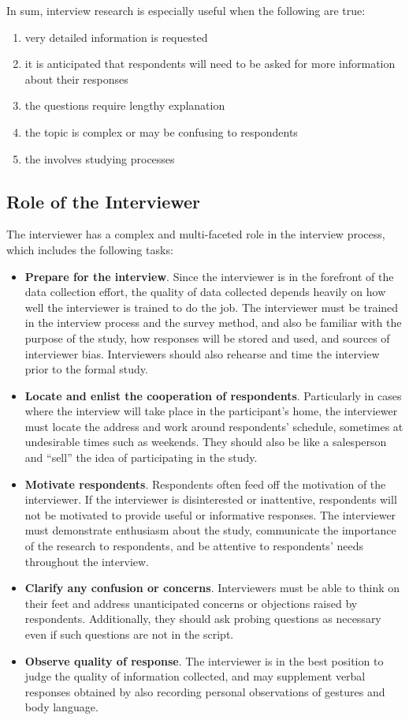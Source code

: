 In sum, interview research is especially useful when the following are true:

\begin{enumerate}
	\item very detailed information is requested
	\item it is anticipated that respondents will need to be asked for more information about their responses
	\item the questions require lengthy explanation
	\item the topic is complex or may be confusing to respondents
	\item the involves studying processes
\end{enumerate}

\subsection{Role of the Interviewer}

The interviewer has a complex and multi-faceted role in the interview process, which includes the following tasks:

\begin{itemize}
	\item \textbf{Prepare for the interview}. Since the interviewer is in the forefront of the data collection effort, the quality of data collected depends heavily on how well the interviewer is trained to do the job. The interviewer must be trained in the interview process and the survey method, and also be familiar with the purpose of the study, how responses will be stored and used, and sources of interviewer bias. Interviewers should also rehearse and time the interview prior to the formal study.
	\item \textbf{Locate and enlist the cooperation of respondents}. Particularly in cases where the interview will take place in the participant's home, the interviewer must locate the address and work around respondents' schedule, sometimes at undesirable times such as weekends. They should also be like a salesperson and ``sell'' the idea of participating in the study.
	\item \textbf{Motivate respondents}. Respondents often feed off the motivation of the interviewer. If the interviewer is disinterested or inattentive, respondents will not be motivated to provide useful or informative responses. The interviewer must demonstrate enthusiasm about the study, communicate the importance of the research to respondents, and be attentive to respondents' needs throughout the interview. 
	\item \textbf{Clarify any confusion or concerns}. Interviewers must be able to think on their feet and address unanticipated concerns or objections raised by respondents. Additionally, they should ask probing questions as necessary even if such questions are not in the script.
	\item \textbf{Observe quality of response}. The interviewer is in the best position to judge the quality of information collected, and may supplement verbal responses obtained by also recording personal observations of gestures and body language.
\end{itemize}

